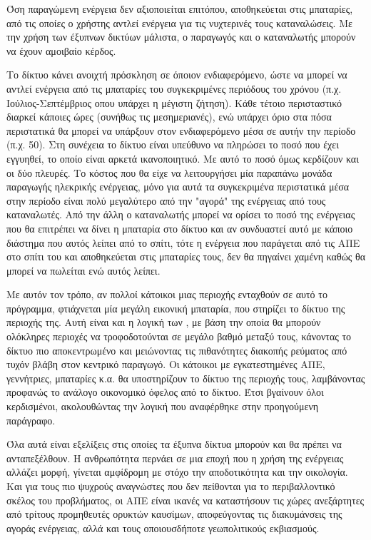 \documentclass[12pt]{report}
\begin{document}
Όση παραγώμενη ενέργεια δεν αξιοποιείται επιτόπου, αποθηκεύεται στις μπαταρίες, από τις οποίες ο χρήστης αντλεί ενέργεια για τις νυχτερινές τους καταναλώσεις. Με την χρήση των έξυπνων δικτύων μάλιστα, ο παραγωγός και ο 	
καταναλωτής μπορούν να έχουν αμοιβαίο κέρδος. 

Το δίκτυο κάνει ανοιχτή πρόσκληση σε όποιον ενδιαφερόμενο, ώστε να μπορεί να αντλεί ενέργεια από τις μπαταρίες του συγκεκριμένες περιόδους του χρόνου (π.χ. Ιούλιος-Σεπτέμβριος οπου υπάρχει η μέγιστη ζήτηση). Κάθε τέτοιο περισταστικό 
διαρκεί κάποιες ώρες (συνήθως τις μεσημεριανές), ενώ υπάρχει όριο στα πόσα περιστατικά θα μπορεί να υπάρξουν στον ενδιαφερόμενο μέσα σε αυτήν την περίοδο (π.χ. 50). Στη συνέχεια το δίκτυο 
είναι υπεύθυνο να πληρώσει το ποσό που έχει εγγυηθεί, το οποίο είναι αρκετά ικανοποιητικό. Με αυτό το ποσό όμως κερδίζουν και οι δύο πλευρές. Το κόστος που θα είχε να λειτουργήσει μία παραπάνω μονάδα παραγωγής ηλεκρικής ενέργειας, 
μόνο για αυτά τα συγκεκριμένα περιστατικά μέσα στην περίοδο είναι πολύ μεγαλύτερο από την "αγορά" της ενέργειας από τους καταναλωτές. Από την άλλη ο καταναλωτής μπορεί να ορίσει το ποσό της ενέργειας που θα 
επιτρέπει να δίνει η μπαταρία στο δίκτυο και αν συνδυαστεί αυτό με κάποιο διάστημα που αυτός λείπει από το σπίτι, τότε η ενέργεια που παράγεται από τις ΑΠΕ στο σπίτι του και αποθηκεύεται στις μπαταρίες τους, δεν θα πηγαίνει 
χαμένη καθώς θα μπορεί να πωλείται ενώ αυτός λείπει. 

Με αυτόν τον τρόπο, αν πολλοί κάτοικοι μιας περιοχής ενταχθούν σε αυτό το πρόγραμμα, φτιάχνεται μία μεγάλη εικονική μπαταρία, που στηρίζει το δίκτυο της περιοχής της. Αυτή είναι και η λογική των {}, με βάση την
οποία θα μπορούν ολόκληρες περιοχές να τροφοδοτούνται σε μεγάλο βαθμό μεταξύ τους, κάνοντας το δίκτυο πιο αποκεντρωμένο και μειώνοντας τις πιθανότητες διακοπής ρεύματος από τυχόν βλάβη στον κεντρικό παραγωγό. Οι κάτοικοι με
εγκατεστημένες ΑΠΕ, γεννήτριες, μπαταρίες κ.α. θα υποστηρίζουν το δίκτυο της περιοχής τους, λαμβάνοντας προφανώς το ανάλογο οικονομικό όφελος από το δίκτυο. Έτσι βγαίνουν όλοι κερδισμένοι, ακολουθώντας την λογική που αναφέρθηκε 
στην προηγούμενη παράγραφο.

Όλα αυτά είναι εξελίξεις στις οποίες τα έξυπνα δίκτυα μπορούν και θα πρέπει να ανταπεξέλθουν. Η ανθρωπότητα περνάει σε μια εποχή που η χρήση της ενέργειας αλλάζει μορφή, γίνεται αμφίδρομη με στόχο την αποδοτικότητα και την οικολογία.
Και για τους πιο ψυχρούς αναγνώστες που δεν πείθονται για το περιβαλλοντικό σκέλος του προβλήματος, οι ΑΠΕ είναι ικανές να καταστήσουν τις χώρες ανεξάρτητες από τρίτους προμηθευτές ορυκτών καυσίμων, αποφεύγοντας τις διακυμάνσεις της 
αγοράς ενέργειας, αλλά και τους οποιουσδήποτε γεωπολιτικούς εκβιασμούς.
\end{document}
